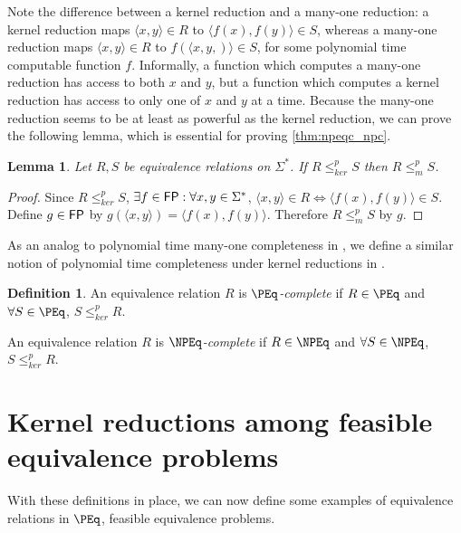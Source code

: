 \documentclass{article}
\newtheorem{lemma}[lemma]{Lemma}
\theoremstyle{definition} \newtheorem{definition}[definition]{Definition}
\newcommand{\sigmastar}{\Sigma^{*}} %
\newcommand{\kr}{\leq^{p}_{ker}} %
\newcommand{\mor}{\leq^{p}_{m}} %
\newcommand{\defn}[1]{\emph{#1}} %
\newcommand{\pair}[2]{\langle#1,#2\rangle} %
\begin{document}
Note the difference between a kernel reduction and a many-one reduction: a
kernel reduction maps $\pair{x}{y}\in R$ to $\pair{f(x)}{f(y)}\in S$, whereas a
many-one reduction maps $\pair{x}{y}\in R$ to $f(\pair{x, y})\in S$, for some
polynomial time computable function $f$. Informally, a function which computes
a many-one reduction has access to both $x$ and $y$, but a function which
computes a kernel reduction has access to only one of $x$ and $y$ at a
time. Because the many-one reduction seems to be at least as powerful as the
kernel reduction, we can prove the following lemma, which is essential for
proving \autoref{thm:npeqc_npc}.

\begin{lemma}\label{lem:kr_mor}Let $R,S$ be equivalence relations on
  $\sigmastar$. If $R\kr S$ then $R\mor S$.\end{lemma}
\begin{proof}
  Since $R\kr S$, $\exists f\in\FP:\forall x,y\in\sigmastar$, $\pair{x}{y}\in
  R\iff\pair{f(x)}{f(y)}\in S$. Define $g\in{\ensuremath{\mathsf{FP}}}$ by
  $g(\pair{x}{y})=\pair{f(x)}{f(y)}$. Therefore $R\mor S$ by $g$.
\end{proof}

As an analog to polynomial time many-one completeness in \NP, we define a
similar notion of polynomial time completeness under kernel reductions in
\NPEq.

\begin{definition}\label{def:kernel_complete}
  An equivalence relation $R$ is \defn{$\PEq$-complete} if $R\in\PEq$ and
  $\forall S\in\PEq$, $S\kr R$.

  An equivalence relation $R$ is \defn{$\NPEq$-complete} if $R\in\NPEq$ and
  $\forall S\in\NPEq$, $S\kr R$.
\end{definition}

\section{Kernel reductions among feasible equivalence problems}

With these definitions in place, we can now define some examples of equivalence
relations in $\PEq$, feasible equivalence problems.
\end{document}
